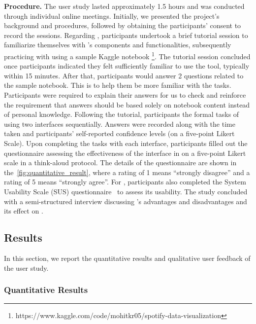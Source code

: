 \textbf{Procedure.}
The user study lasted approximately 1.5 hours and was conducted through individual online meetings. 
Initially, we presented the project's background and procedures, followed by obtaining the participants' consent to record the sessions.
Regarding \tool, participants undertook a brief tutorial session to familiarize themselves with \tool's components and functionalities, subsequently practicing with \tool using a sample Kaggle notebook
\footnote{https://www.kaggle.com/code/mohitkr05/spotify-data-visualization}. 
The tutorial session concluded once participants indicated they felt sufficiently familiar to use the tool, typically within 15 minutes.
After that, participants would answer 2 questions related to the sample notebook. This is to help them be more familiar with the tasks.
Participants were required to explain their answers for us to check and reinforce the requirement that answers should be based solely on notebook content instead of personal knowledge.
Following the tutorial, participants  the formal tasks of using two interfaces sequentially.
Answers were recorded along with the time taken and participants' self-reported confidence levels (on a five-point Likert Scale).
Upon completing the tasks with each interface, participants filled out the questionnaire assessing the effectiveness of the interface in   on a five-point Likert scale in a think-aloud protocol.
The details of the questionnaire are shown in the~\autoref{fig:quantitative_result}, where a rating of 1 means ``strongly disagree'' and a rating of 5 means ``strongly agree''. 
For \tool, participants also completed the System Usability Scale (SUS) questionnaire~\cite{brooke1996sus} to assess its usability. 
The study concluded with a semi-structured interview discussing \tool's advantages and disadvantages and its effect on .



\subsection{Results}
\label{sec:results}

In this section, we report the quantitative results and qualitative user feedback of the user study.

\subsubsection{Quantitative Results}

